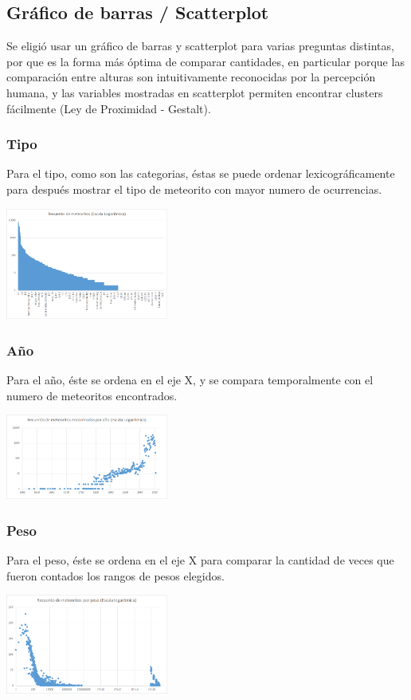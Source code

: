 \documentclass[letterpaper,10pt]{article}
\begin{document}
	\subsection{Gráfico de barras / Scatterplot}

	Se eligió usar un gráfico de barras y scatterplot para varias preguntas distintas, por que es la forma más óptima de comparar cantidades, en particular porque las comparación entre alturas
	son intuitivamente reconocidas por la percepción humana, y las variables mostradas en scatterplot permiten encontrar clusters fácilmente (Ley de Proximidad - Gestalt).

	\subsubsection{Tipo}
	Para el tipo, como son las categorias, éstas se puede ordenar lexicográficamente para después mostrar el tipo de meteorito con mayor numero de ocurrencias.

	\begin{center}
		\includegraphics[width=0.4\textwidth]{recurrentes2.png}
	\end{center}

	\subsubsection{Año}
	Para el año, éste se ordena en el eje X, y se compara temporalmente con el numero de meteoritos encontrados.

	\begin{center}
		\includegraphics[width=0.4\textwidth]{year2.png}
	\end{center}

	\subsubsection{Peso}
	Para el peso, éste se ordena en el eje X para comparar la cantidad de veces que fueron contados los rangos de pesos elegidos.

	\begin{center}
		\includegraphics[width=0.4\textwidth]{masa2.png}
	\end{center}

\end{document}
